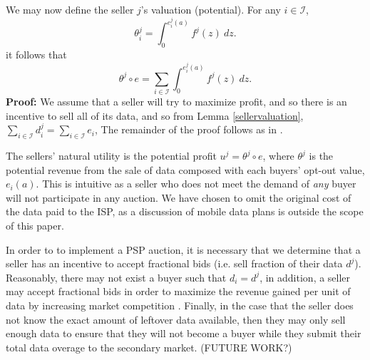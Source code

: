 \documentclass[12pt]{article}
\theoremstyle{definition}
\newcommand{\mcI}{\mathcal{I}}
\begin{document}
\begin{multicols}{2}
We may now define the seller $j$'s valuation (potential). 
{
\label{sellervaluation}
For any $i\in\mcI$, 
\begin{equation}\label{singlevaluation}
    \theta_i^j = \int_0^{e_i^j(a)} f^j(z) \ dz.
\end{equation}
it follows that 
\begin{equation}\label{valuation}
    \theta^j \circ e = \displaystyle\sum_{i\in\mcI}
 \int_0^{e_i^j(a)} f^j(z) \ dz.
\end{equation}
}
\textbf{Proof:} 
We assume that a seller will try to maximize profit, and
so there is an incentive to sell all of its data, and so from Lemma
\ref{sellervaluation},  $\sum_{i\in{\mcI}} d_i^j = 
\sum_{i\in\mcI} e_i$,
The remainder of the proof follows as in \cite{semret}.

The sellers' natural utility is the potential
profit $u^j = \theta^j\circ e$, where $\theta^j$ is the
potential revenue from the sale of data composed with each buyers' opt-out value, $e_i(a)$. 
This is intuitive as a seller who does not meet the demand of \emph{any} buyer will not
participate in any auction. We have chosen to omit the original cost of the data
paid to the ISP, as a discussion of mobile data plans is outside the scope of this
paper. 

In order to to implement a PSP auction, it is necessary that we determine 
that a seller has an incentive to
accept fractional bids (i.e. sell fraction of their data $d^j$). Reasonably,
there may not exist a buyer such that $d_i = d^j$, in addition, a seller may accept
fractional bids in order to
maximize the revenue gained per unit of data by increasing market competition
\cite{???}.
Finally, in the case that the seller does not know the exact amount of
leftover data available, then they may only sell enough data to ensure that
they will not become a buyer while they submit their total data overage to the
secondary market. (FUTURE WORK?)


\end{multicols}
\end{document}
